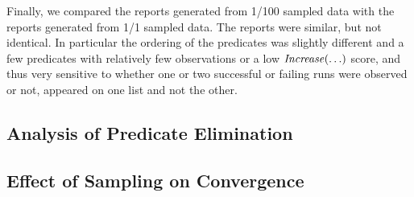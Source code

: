 Finally, we compared the reports generated from 1/100 sampled data
with the reports generated from 1/1 sampled data.  The reports were
similar, but not identical.  In particular the ordering of the
predicates was slightly different and a few predicates with relatively
few observations or a low $\mbox{\textit{Increase}}(\ldots)$ score, and thus very
sensitive to whether one or two successful or failing runs were
observed or not, appeared on one list and not the other.


\subsection{Analysis of Predicate Elimination}

\subsection{Effect of Sampling on Convergence}





